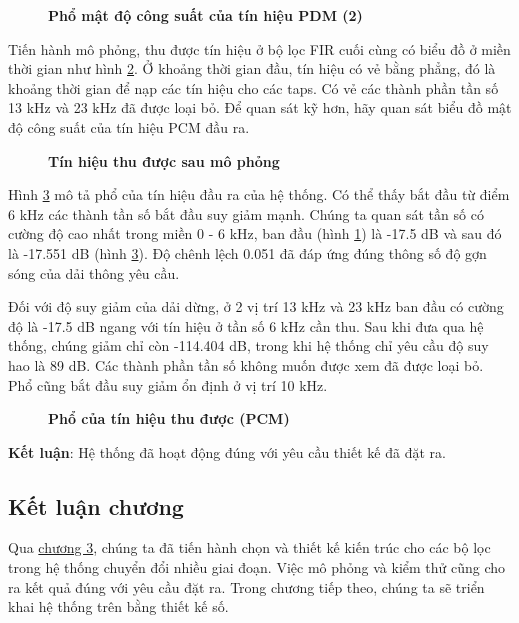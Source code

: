 \begin{figure}[H]
    \centering
    
    \caption[Phổ mật độ công suất của tín hiệu PDM (2)]{\bfseries \fontsize{12pt}{0pt}\selectfont Phổ mật độ công suất của tín hiệu PDM (2)}
    \label{sd3}
\end{figure}

Tiến hành mô phỏng, thu được tín hiệu ở bộ lọc FIR cuối cùng có biểu đồ ở miền thời gian như hình \ref{pcm_o}. Ở khoảng thời gian đầu, tín hiệu có vẻ bằng phẳng, đó là khoảng thời gian để nạp các tín hiệu cho các taps. Có vẻ các thành phần tần số 13 kHz và 23 kHz đã được loại bỏ. Để quan sát kỹ hơn, hãy quan sát biểu đồ mật độ công suất của tín hiệu PCM đầu ra.
\begin{figure}[H]
    \centering
    
    \caption[Tín hiệu thu được sau mô phỏng]{\bfseries \fontsize{12pt}{0pt}\selectfont Tín hiệu thu được sau mô phỏng}
    \label{pcm_o}
\end{figure}

Hình \ref{psd_pcm} mô tả phổ của tín hiệu đầu ra của hệ thống. Có thể thấy bắt đầu từ điểm 6 kHz các thành tần số bắt đầu suy giảm mạnh. Chúng ta quan sát tần số có cường độ cao nhất trong miền 0 - 6 kHz, ban đầu (hình \ref{sd3}) là -17.5 dB và sau đó là -17.551 dB (hình \ref{psd_pcm}). Độ chênh lệch 0.051 đã đáp ứng đúng thông số độ gợn sóng của dải thông yêu cầu.

Đối với độ suy giảm của dải dừng, ở 2 vị trí 13 kHz và 23 kHz ban đầu có cường độ là -17.5 dB ngang với tín hiệu ở tần số 6 kHz cần thu. Sau khi đưa qua hệ thống, chúng giảm chỉ còn -114.404 dB, trong khi hệ thống chỉ yêu cầu độ suy hao là 89 dB. Các thành phần tần số không muốn được xem đã được loại bỏ. Phổ cũng bắt đầu suy giảm ổn định ở vị trí 10 kHz.
\begin{figure}[H]
    \centering
    
    \caption[Phổ của tín hiệu thu được (PCM)]{\bfseries \fontsize{12pt}{0pt}\selectfont Phổ của tín hiệu thu được (PCM)}
    \label{psd_pcm}
\end{figure}
\textbf{Kết luận}: Hệ thống đã hoạt động đúng với yêu cầu thiết kế đã đặt ra.

\subsection{Kết luận chương}

Qua \hyperref[chuong3]{chương 3}, chúng ta đã tiến hành chọn và thiết kế kiến trúc cho các bộ lọc trong hệ thống chuyển đổi nhiều giai đoạn. Việc mô phỏng và kiểm thử cũng cho ra kết quả đúng với yêu cầu đặt ra. Trong chương tiếp theo, chúng ta sẽ triển khai hệ thống trên bằng thiết kế số.
\newpage
